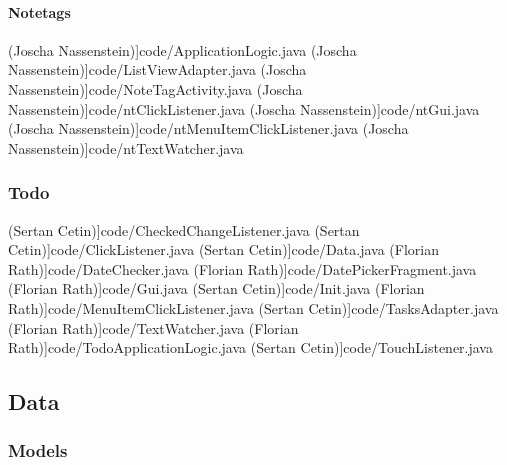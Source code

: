 		\paragraph{Notetags}
 (Joscha Nassenstein)]{code/ApplicationLogic.java}
 (Joscha Nassenstein)]{code/ListViewAdapter.java}
 (Joscha Nassenstein)]{code/NoteTagActivity.java}
 (Joscha Nassenstein)]{code/ntClickListener.java}
 (Joscha Nassenstein)]{code/ntGui.java}
 (Joscha Nassenstein)]{code/ntMenuItemClickListener.java}
 (Joscha Nassenstein)]{code/ntTextWatcher.java}
	\subsubsection{Todo}
 (Sertan Cetin)]{code/CheckedChangeListener.java}
 (Sertan Cetin)]{code/ClickListener.java}
 (Sertan Cetin)]{code/Data.java}
 (Florian Rath)]{code/DateChecker.java}
 (Florian Rath)]{code/DatePickerFragment.java}
 (Florian Rath)]{code/Gui.java}
 (Sertan Cetin)]{code/Init.java}
 (Florian Rath)]{code/MenuItemClickListener.java}
 (Sertan Cetin)]{code/TasksAdapter.java}
 (Florian Rath)]{code/TextWatcher.java}
 (Florian Rath)]{code/TodoApplicationLogic.java}
 (Sertan Cetin)]{code/TouchListener.java}
\subsection{Data}
	\subsubsection{Models}
